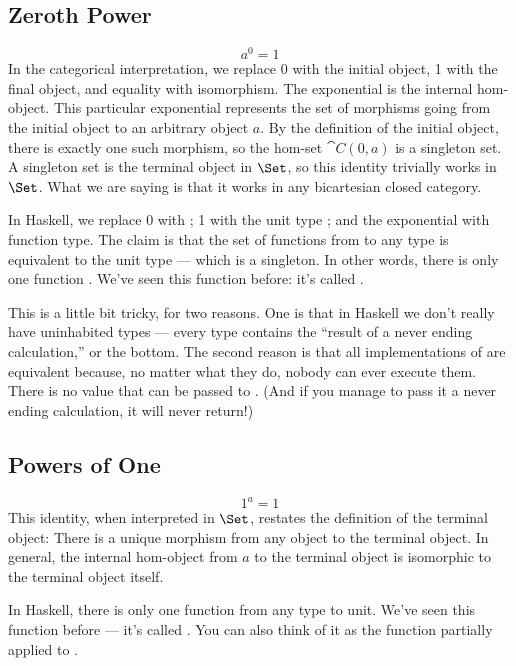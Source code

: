 \subsection{Zeroth Power}

\[a^{0} = 1\]
In the categorical interpretation, we replace 0 with the initial object,
1 with the final object, and equality with isomorphism. The exponential
is the internal hom-object. This particular exponential represents the
set of morphisms going from the initial object to an arbitrary object
$a$. By the definition of the initial object, there is exactly
one such morphism, so the hom-set $\cat{C}(0, a)$ is a singleton set. A
singleton set is the terminal object in $\Set$, so this identity
trivially works in $\Set$. What we are saying is that it works in
any bicartesian closed category.

In Haskell, we replace 0 with ; 1 with the unit type
\code{()}; and the exponential with function type. The claim is that
the set of functions from  to any type  is
equivalent to the unit type --- which is a singleton. In other words,
there is only one function . We've seen
this function before: it's called .

This is a little bit tricky, for two reasons. One is that in Haskell we
don't really have uninhabited types --- every type contains the ``result
of a never ending calculation,'' or the bottom. The second reason is
that all implementations of  are equivalent because, no
matter what they do, nobody can ever execute them. There is no value
that can be passed to . (And if you manage to pass it a
never ending calculation, it will never return!)

\subsection{Powers of One}

\[1^{a} = 1\]
This identity, when interpreted in $\Set$, restates the definition
of the terminal object: There is a unique morphism from any object to
the terminal object. In general, the internal hom-object from $a$
to the terminal object is isomorphic to the terminal object itself.

In Haskell, there is only one function from any type  to unit.
We've seen this function before --- it's called . You can
also think of it as the function  partially applied to
\code{()}.

